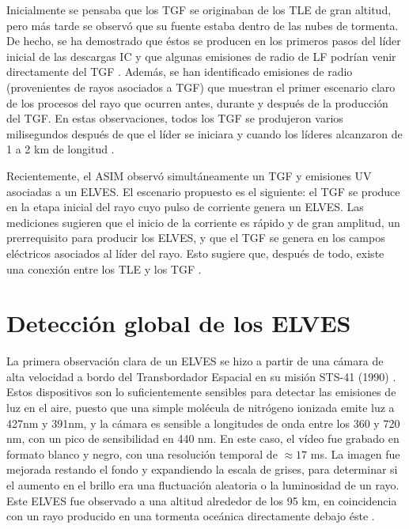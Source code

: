 \documentclass[11pt,oneside,openany,letter]{book}
\begin{document}
Inicialmente se pensaba que los TGF se originaban de los TLE de gran altitud, pero más tarde se observó que su fuente estaba dentro de las nubes de tormenta. De hecho, se ha demostrado que \'estos se producen en los primeros pasos del líder inicial de las descargas IC y que algunas emisiones de radio de LF podr\'ian venir directamente del TGF \cite{LyuEtal2018}. Adem\'as, se han identificado emisiones de radio (provenientes de rayos asociados a TGF) que muestran el primer escenario claro de los procesos del rayo que ocurren antes, durante y después de la producción del TGF. En estas observaciones, todos los TGF se produjeron varios milisegundos después de que el líder se iniciara y cuando los líderes alcanzaron de 1 a 2 km de longitud \cite{CummerEtal2015}.

Recientemente, el ASIM observ\'o simultáneamente un TGF y emisiones UV asociadas a un ELVES. El escenario propuesto es el siguiente: el TGF se produce en la etapa inicial del rayo cuyo pulso de corriente genera un ELVES. Las mediciones sugieren que el inicio de la corriente es rápido y de gran amplitud, un prerrequisito para producir los ELVES, y que el TGF se genera en los campos eléctricos asociados al líder del rayo. Esto sugiere que, después de todo, existe una conexión entre los TLE y los TGF \cite{neubertEtal2020}. 


\chapter{Detección global de los ELVES}\label{deteccion}
La primera observación clara de un ELVES se hizo a partir de una cámara de alta velocidad a bordo del Transbordador Espacial en su misión STS-41 (1990) \cite{BoeckEtal1992}. Estos dispositivos son lo suficientemente sensibles para detectar las emisiones de luz en el aire, puesto que una simple molécula de nitrógeno ionizada emite luz a 427nm y 391nm, y la cámara es sensible a longitudes de onda entre los 360 y 720 nm, con un pico de sensibilidad en 440 nm. En este caso, el vídeo fue grabado en formato blanco y negro, con una resolución temporal de $\approx 17$ ms. La imagen fue mejorada restando el fondo y expandiendo la escala de grises, para determinar si el aumento en el brillo era una fluctuación aleatoria o la luminosidad de un rayo. Este ELVES fue observado a una altitud alrededor de los 95 km, en coincidencia con un rayo producido en una tormenta oceánica directamente debajo \'este  \cite{BoeckEtal1992}.  
\end{document}
